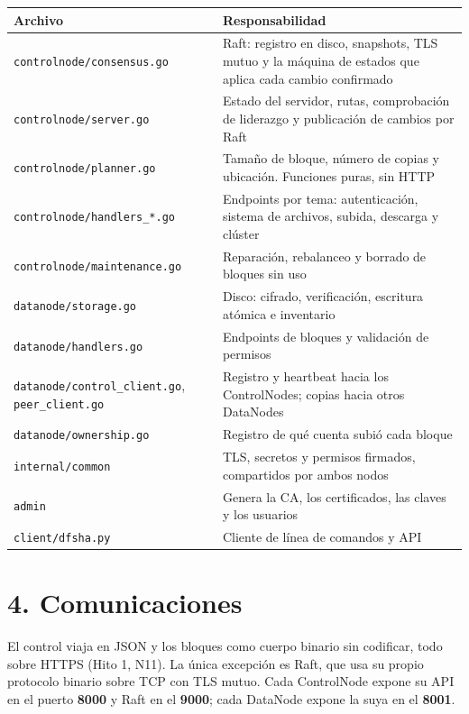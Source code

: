 \documentclass[10pt]{article}
\begin{document}
\begin{xltabular}{\linewidth}{@{}L{5.2cm}Y@{}}
\toprule
Archivo & Responsabilidad \\
\midrule\endhead
\texttt{controlnode/consensus.go} & Raft: registro en disco, snapshots, TLS mutuo y la máquina de estados que aplica cada cambio confirmado \\
\texttt{controlnode/server.go} & Estado del servidor, rutas, comprobación de liderazgo y publicación de cambios por Raft \\
\texttt{controlnode/planner.go} & Tamaño de bloque, número de copias y ubicación. Funciones puras, sin HTTP \\
\texttt{controlnode/handlers\_*.go} & Endpoints por tema: autenticación, sistema de archivos, subida, descarga y clúster \\
\texttt{controlnode/maintenance.go} & Reparación, rebalanceo y borrado de bloques sin uso \\
\texttt{datanode/storage.go} & Disco: cifrado, verificación, escritura atómica e inventario \\
\texttt{datanode/handlers.go} & Endpoints de bloques y validación de permisos \\
\texttt{datanode/control\_client.go}, \texttt{peer\_client.go} & Registro y heartbeat hacia los ControlNodes; copias hacia otros DataNodes \\
\texttt{datanode/ownership.go} & Registro de qué cuenta subió cada bloque \\
\texttt{internal/common} & TLS, secretos y permisos firmados, compartidos por ambos nodos \\
\texttt{admin} & Genera la CA, los certificados, las claves y los usuarios \\
\texttt{client/dfsha.py} & Cliente de línea de comandos y API \\
\bottomrule
\end{xltabular}

\separador

\section{4. Comunicaciones}

El control viaja en JSON y los bloques como cuerpo binario sin codificar, todo sobre HTTPS (Hito 1, N11). La única excepción es Raft, que usa su propio protocolo binario sobre TCP con TLS mutuo. Cada ControlNode expone su API en el puerto \textbf{8000} y Raft en el \textbf{9000}; cada DataNode expone la suya en el \textbf{8001}.
\end{document}
